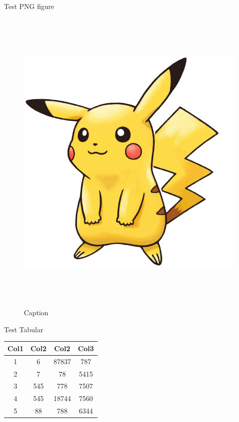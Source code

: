\documentclass{beamer}
\begin{document}
\begin{frame}[t]
\begin{minipage}[t][0.93\textheight][t]{0.31\textwidth}
        \begin{block}{Test PNG figure}
        \begin{figure}[h]
            \centering
            \includegraphics[height=6in]{figures/pikachu-clipart-svg-7-transparent.png}
            \caption{Caption}
            \label{fig:my_labeddl}
        \end{figure}
        \end{block}
   
    \end{minipage}
    \hspace{0.03\linewidth}
    \begin{minipage}[t][0.93\textheight][t]{0.31\textwidth}
            
            
        \begin{block}{Test Tabular}
    
        \begin{center}
         \begin{tabular}{||c c c c||} 
         \hline
         Col1 & Col2 & Col2 & Col3 \\ [0.5ex] 
         \hline\hline
         1 & 6 & 87837 & 787 \\ 
         \hline
         2 & 7 & 78 & 5415 \\
         \hline
         3 & 545 & 778 & 7507 \\
         \hline
         4 & 545 & 18744 & 7560 \\
         \hline
         5 & 88 & 788 & 6344 \\ [1ex] 
         \hline
        \end{tabular}
        \end{center}
        

\end{block}
\end{minipage}
\end{frame}
\end{document}
